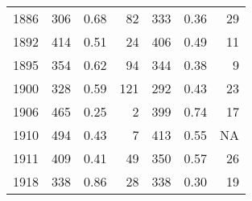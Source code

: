 \begin{table}[!h]
{\begin{tabular}[t]{rrrrrrr}
1886 & 306 & 0.68 & 82 & 333 & 0.36 & 29\\
1892 & 414 & 0.51 & 24 & 406 & 0.49 & 11\\
1895 & 354 & 0.62 & 94 & 344 & 0.38 & 9\\
1900 & 328 & 0.59 & 121 & 292 & 0.43 & 23\\
1906 & 465 & 0.25 & 2 & 399 & 0.74 & 17\\
1910 & 494 & 0.43 & 7 & 413 & 0.55 & NA\\
1911 & 409 & 0.41 & 49 & 350 & 0.57 & 26\\
1918 & 338 & 0.86 & 28 & 338 & 0.30 & 19\\
\bottomrule
\end{tabular}}
\end{table}